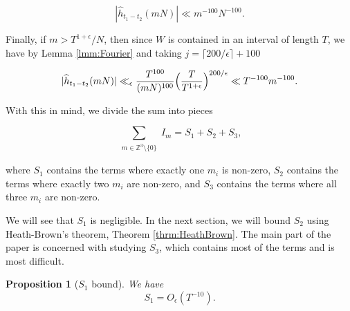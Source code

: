 \documentclass{amsart}
\theoremstyle{plain}
\newtheorem{prpstn}[thrm]{Proposition}
\numberwithin{equation}{section}
\newcommand{\ZZ}{\mathbb{Z}}
\begin{document}
\begin{equation}
\label{tsamemn0} 
| \widehat{h}_{t_1-t_2}(mN) |  \ll m^{-100} N^{-100}. 
\end{equation}

Finally, if $m>T^{1+\epsilon}/N$, then since $W$ is contained in an interval of length $T$, we have by Lemma \ref{lmm:Fourier} and taking $j=\lceil 200/\epsilon\rceil+100$

\begin{equation}
| \widehat{h}_{t_1-t_2}(mN) |   \ll_\epsilon \frac{T^{100}}{(mN)^{100}} \Bigl(\frac{T}{T^{1+\epsilon}}\Bigr)^{200/\epsilon}\ll T^{-100}m^{-100} . 
\label{eq:FourierTail}
\end{equation}



With this in mind, we divide the sum into pieces

\begin{equation}
\sum_{\substack{m \in \ZZ^3\setminus\{0\}}} I_m = S_1 + S_2 + S_3, 
\label{eq:SiExpansion}
\end{equation}

\noindent where $S_1$ contains the terms where exactly one $m_i$ is non-zero, $S_2$ contains the terms where exactly two $m_i$ are non-zero, and $S_3$ contains the terms where all three $m_i$ are non-zero.

We will see that $S_1$ is negligible.  In the next section, we will bound $S_2$ using Heath-Brown's theorem,  Theorem \ref{thrm:HeathBrown}.   The main part of the paper is concerned with studying $S_3$, which contains most of the terms and is most difficult.  

%
%

\begin{prpstn}[$S_1$ bound]\label{prpstn:S1}
We have
\[
S_1=O_\epsilon(T^{-10}).
\]
\end{prpstn}
\end{document}
